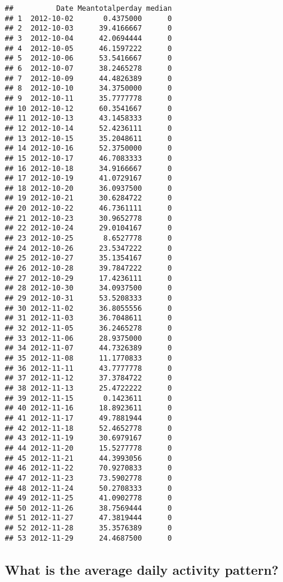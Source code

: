 \documentclass[]{article}
\begin{document}
\begin{verbatim}
##          Date Meantotalperday median
## 1  2012-10-02       0.4375000      0
## 2  2012-10-03      39.4166667      0
## 3  2012-10-04      42.0694444      0
## 4  2012-10-05      46.1597222      0
## 5  2012-10-06      53.5416667      0
## 6  2012-10-07      38.2465278      0
## 7  2012-10-09      44.4826389      0
## 8  2012-10-10      34.3750000      0
## 9  2012-10-11      35.7777778      0
## 10 2012-10-12      60.3541667      0
## 11 2012-10-13      43.1458333      0
## 12 2012-10-14      52.4236111      0
## 13 2012-10-15      35.2048611      0
## 14 2012-10-16      52.3750000      0
## 15 2012-10-17      46.7083333      0
## 16 2012-10-18      34.9166667      0
## 17 2012-10-19      41.0729167      0
## 18 2012-10-20      36.0937500      0
## 19 2012-10-21      30.6284722      0
## 20 2012-10-22      46.7361111      0
## 21 2012-10-23      30.9652778      0
## 22 2012-10-24      29.0104167      0
## 23 2012-10-25       8.6527778      0
## 24 2012-10-26      23.5347222      0
## 25 2012-10-27      35.1354167      0
## 26 2012-10-28      39.7847222      0
## 27 2012-10-29      17.4236111      0
## 28 2012-10-30      34.0937500      0
## 29 2012-10-31      53.5208333      0
## 30 2012-11-02      36.8055556      0
## 31 2012-11-03      36.7048611      0
## 32 2012-11-05      36.2465278      0
## 33 2012-11-06      28.9375000      0
## 34 2012-11-07      44.7326389      0
## 35 2012-11-08      11.1770833      0
## 36 2012-11-11      43.7777778      0
## 37 2012-11-12      37.3784722      0
## 38 2012-11-13      25.4722222      0
## 39 2012-11-15       0.1423611      0
## 40 2012-11-16      18.8923611      0
## 41 2012-11-17      49.7881944      0
## 42 2012-11-18      52.4652778      0
## 43 2012-11-19      30.6979167      0
## 44 2012-11-20      15.5277778      0
## 45 2012-11-21      44.3993056      0
## 46 2012-11-22      70.9270833      0
## 47 2012-11-23      73.5902778      0
## 48 2012-11-24      50.2708333      0
## 49 2012-11-25      41.0902778      0
## 50 2012-11-26      38.7569444      0
## 51 2012-11-27      47.3819444      0
## 52 2012-11-28      35.3576389      0
## 53 2012-11-29      24.4687500      0
\end{verbatim}

\subsection{What is the average daily activity
pattern?}\label{what-is-the-average-daily-activity-pattern}
\end{document}
